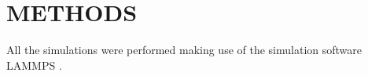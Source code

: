 \newpage
\section{METHODS}
All the simulations  were performed making use of the simulation software LAMMPS
\cite{LAMMPSDocumentation,steveplimptonLAMMPS}
.











